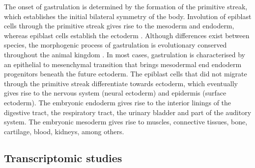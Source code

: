 The onset of gastrulation is determined by the formation of the primitive streak, which establishes the initial bilateral symmetry of the body. Involution of epiblast cells through the primitive streak gives rise to the mesoderm and endoderm, whereas epiblast cells establish the ectoderm \cite{Arnold2009,Tam2007,Tam1997,Tam1993}. Although differences exist between species, the morphogenic process of gastrulation is evolutionary conserved throughout the animal kingdom \cite{Solnica-Krezel2012}. In most cases, gastrulation is characterised by an epithelial to mesenchymal transition that brings mesodermal end endoderm progenitors beneath the future ectoderm. The epiblast cells that did not migrate through the primitive streak differentiate towards ectoderm, which eventually gives rise to the nervous system (neural ectoderm) and epidermis (surface ectoderm). The embryonic endoderm gives rise to the interior linings of the digestive tract, the respiratory tract, the urinary bladder and part of the auditory system. The embryonic mesoderm gives rise to muscles, connective tissues, bone, cartilage, blood, kidneys, among others. 

\subsection{Transcriptomic studies}

